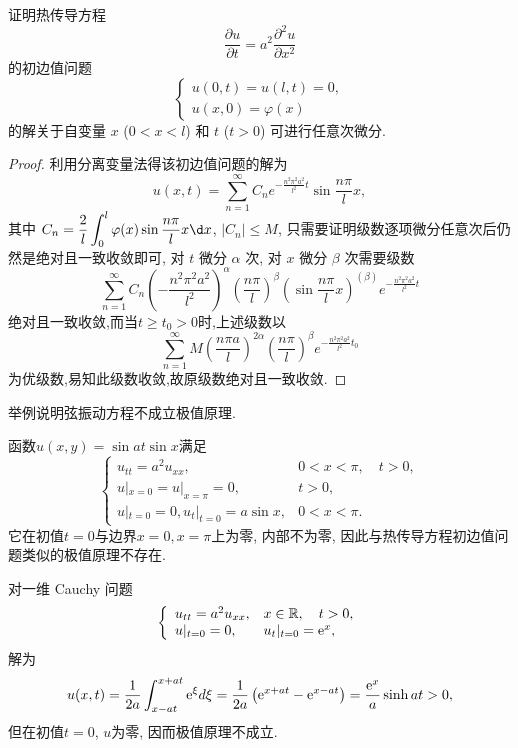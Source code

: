 \begin{exercise}
	证明热传导方程
	\[\frac{\partial u}{\partial t} = a^2 \frac{\partial^2 u}{\partial x^2}\]
	的初边值问题
	\[\begin{cases}
		u(0, t) = u(l, t) = 0, \\
		u(x, 0) = \varphi(x)
	\end{cases}\]
	的解关于自变量 $x$ ($0<x<l$) 和 $t$ ($t>0$) 可进行任意次微分.
\end{exercise}

\begin{proof}
	利用分离变量法得该初边值问题的解为
	\[u(x,t) = \sum_{n=1}^{\infty}C_ne^{-\frac{n^2\pi^2a^2}{l^2}t}\sin\frac{n\pi}{l}x,\]
	其中 $\displaystyle C_n=\frac{2}{l}\int_0^l\varphi(x)\sin\frac{n\pi}{l}x\d x$,
	$|C_n|\leq M$, 只需要证明级数逐项微分任意次后仍然是绝对且一致收敛即可,
	对 $t$ 微分 $\alpha$ 次, 对 $x$ 微分 $\beta$ 次需要级数
	\[\sum_{n=1}^{\infty}C_n\left(-\frac{n^2\pi^2a^2}{l^2}\right)^{\alpha}\left(\frac{n\pi}{l}\right)^{\beta}\left(\sin\frac{n\pi}{l}x\right)^{(\beta)}e^{-\frac{n^2\pi^2a^2}{l^2}t}\]
	绝对且一致收敛,而当$t\geq t_0>0$时,上述级数以
	\[\sum_{n=1}^{\infty}M\left(\frac{n\pi a}{l}\right)^{2\alpha}\left(\frac{n\pi}{l}\right)^{\beta}e^{-\frac{n^2\pi^2a^2}{l^2}t_0}\]
	为优级数,易知此级数收敛,故原级数绝对且一致收敛.
\end{proof}


\begin{exercise}
	举例说明弦振动方程不成立极值原理.
\end{exercise}

\begin{solution}
	函数$u(x,y)=\sin at\sin x$满足
	$$\begin{cases}
		u_{tt}=a^2u_{xx},&0<x<\pi,\quad t>0,\\
		u|_{x=0}=u|_{x=\pi}=0,&t>0,\\u|_{t=0}=0,u_t|_{t=0}=a\sin x,&0<x<\pi.
	\end{cases}$$
	它在初值$t=0$与边界$x=0, x=\pi$上为零, 内部不为零, 因此与热传导方程初边值问题类似的极值原理不存在.
	
	对一维 Cauchy 问题
	$$\left.\left\{\begin{array}{ll}u_{tt}=a^2u_{xx},&x\in\mathbb{R},\quad t>0,\\u|_{t=0}=0,&u_t|_{t=0}=\mathrm{e}^x,\end{array}\right.\right.$$
	解为
	$$u(x,t)=\frac1{2a}\int_{x-at}^{x+at}\mathrm{e}^\xi d\xi=\frac1{2a}\left(\mathrm{e}^{x+at}-\mathrm{e}^{x-at}\right)=\frac{\mathrm{e}^x}a\sinh at>0,$$
	但在初值$t=0$, $u$为零, 因而极值原理不成立.
\end{solution}